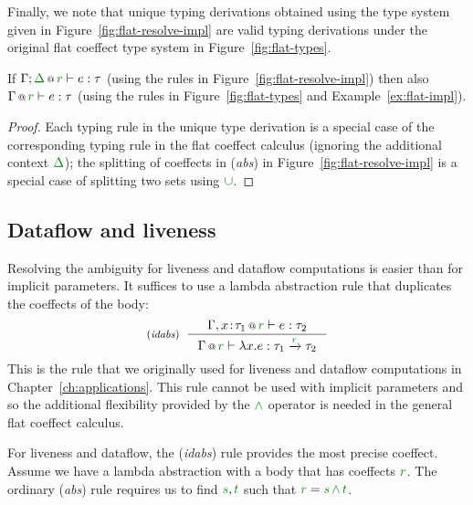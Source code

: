 \noindent
Finally, we note that unique typing derivations obtained using the type system given in
Figure~\ref{fig:flat-resolve-impl} are valid typing derivations under the original flat coeffect
type system in Figure~\ref{fig:flat-types}.

\begin{theorem}
\label{thm:flat-impl-admis}
  If $\coctx{\Gamma;\cclrd{\Delta}}{\cclrd{r}} \vdash e : \tau$ (using the rules in
  Figure~\ref{fig:flat-resolve-impl}) then also $\coctx{\Gamma}{\cclrd{r}} \vdash e : \tau$
  (using the rules in Figure~\ref{fig:flat-types} and Example~\ref{ex:flat-impl}).
\end{theorem}
\begin{proof}
  Each typing rule in the unique type derivation is a special case of the corresponding
  typing rule in the flat coeffect calculus (ignoring the additional context $\cclrd{\Delta}$); the
  splitting of coeffects in (\emph{abs}) in Figure~\ref{fig:flat-resolve-impl} is a special case
  of splitting two sets using $\cclrd{\cup}$.
\end{proof}


\subsection{Dataflow and liveness}
\label{sec:flat-unique-ldf}

Resolving the ambiguity for liveness and dataflow computations is easier than for implicit
parameters. It suffices to use a lambda abstraction rule that duplicates the coeffects of the
body:
%
\begin{equation*}
\tyrule{idabs}
  {\coctx{\Gamma, x\!:\!\tau_1}{\cclrd{r}} \vdash e : \tau_2}
  {\coctx{\Gamma}{\cclrd{r}} \vdash \lambda x.e : \tau_1 \xrightarrow{\cclrd{r}} \tau_2 }
\end{equation*}
%
This is the rule that we originally used for liveness and dataflow computations in
Chapter~\ref{ch:applications}. This rule cannot be used with implicit parameters and so
the additional flexibility provided by the $\czip$ operator is needed in the general flat
coeffect calculus.

For liveness and dataflow, the (\emph{idabs}) rule provides the most precise coeffect.
Assume we have a lambda abstraction with a body that has coeffects $\cclrd{r}$. The
ordinary (\emph{abs}) rule requires us to find $\cclrd{s}, \cclrd{t}$ such that
$\cclrd{r}=\cclrd{s}\,\czip\,\cclrd{t}$.

